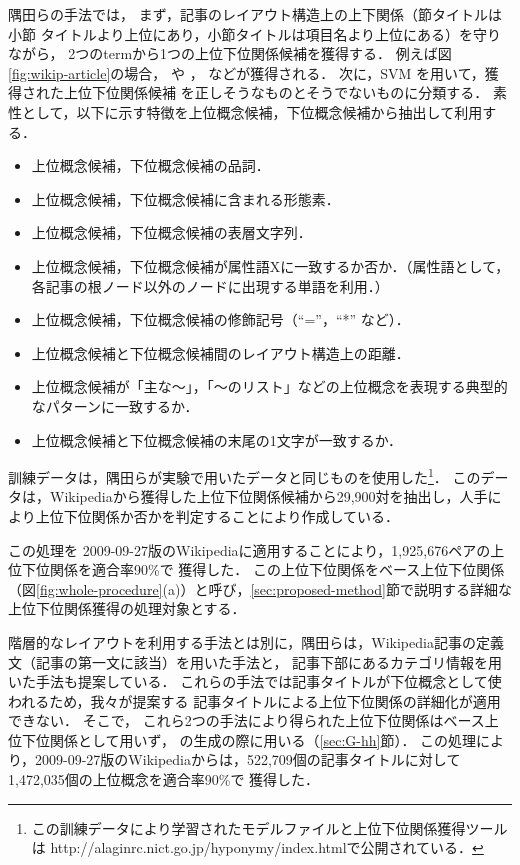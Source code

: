 \documentclass[japanese]{jnlp_1.4}
\newcommand{\ghype}{}
\newcommand{\isa}[2]{}
\begin{document}
隅田らの手法では，
まず，記事のレイアウト構造上の上下関係（節タイトルは小節
タイトルより上位にあり，小節タイトルは項目名より上位にある）を守りながら，
2つのtermから1つの上位下位関係候補を獲得する．
例えば図\ref{fig:wikip-article}の場合，
\isa{製品}{コンピュータ}や
\isa{コンピュータ}{Mac mini}，
\isa{製品}{Mac mini}などが獲得される．
次に，SVM \cite{Vapnik:1995}を用いて，獲得された上位下位関係候補
を正しそうなものとそうでないものに分類する．
素性として，以下に示す特徴を上位概念候補，下位概念候補から抽出して利用する．
\begin{itemize}
\item 上位概念候補，下位概念候補の品詞．
\item 上位概念候補，下位概念候補に含まれる形態素．
\item 上位概念候補，下位概念候補の表層文字列．
\item 上位概念候補，下位概念候補が属性語Xに一致するか否か．（属性語として，各記事の根ノード以外のノードに出現する単語を利用．）
\item 上位概念候補，下位概念候補の修飾記号（``=''，``*'' など）．
\item 上位概念候補と下位概念候補間のレイアウト構造上の距離．
\item 上位概念候補が「主な〜」，「〜のリスト」などの上位概念を表現する典型的なパターンに一致するか．
\item 上位概念候補と下位概念候補の末尾の1文字が一致するか．
\end{itemize}
訓練データは，隅田らが実験で用いたデータと同じものを使用した\footnote{この訓練データにより学習されたモデルファイルと上位下位関係獲得ツールは http://\linebreak[2]alaginrc.nict.go.jp/\linebreak[2]hyponymy/\linebreak[2]index.htmlで公開されている．}．
このデータは，Wikipediaから獲得した上位下位関係候補から29,900対を抽出し，人手により上位下位関係か否かを判定することにより作成している．


この処理を
2009-09-27版のWikipediaに適用することにより，1,925,676ペアの上位下位関係を適合率90\%で
獲得した．
この上位下位関係をベース上位下位関係（図\ref{fig:whole-procedure}(a)）と呼び，\ref{sec:proposed-method}節で説明する詳細な上位下位関係獲得の処理対象とする．

階層的なレイアウトを利用する手法とは別に，隅田らは，Wikipedia記事の定義文（記事の第一文に該当）を用いた手法と，
記事下部にあるカテゴリ情報を用いた手法も提案している．
これらの手法では記事タイトルが下位概念として使われるため，我々が提案する
記事タイトルによる上位下位関係の詳細化が適用できない．
そこで，
これら2つの手法により得られた上位下位関係はベース上位下位関係として用いず，
\ghype{}の生成の際に用いる（\ref{sec:G-hh}節）．
この処理により，2009-09-27版のWikipediaからは，522,709個の記事タイトルに対して1,472,035個の上位概念を適合率90\%で
獲得した．
\end{document}

